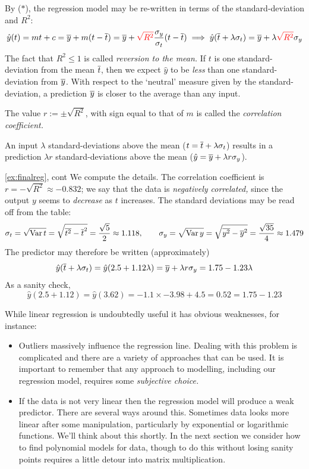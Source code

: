 
By ($\ast$), the regression model may be re-written in terms of the standard-deviation and $R^2$: 
\[\hat y(t)=mt+c=\overline{y}+m(t-\overline{t}) =\overline{y}+\textcolor{red}{\sqrt{R^2}}\frac{\sigma_y}{\sigma_t}(t-\overline{t}) \implies \hat y(\overline{t}+\lambda\sigma_t)=\overline{y}+\lambda\textcolor{red}{\sqrt{R^2}}\sigma_y\]
The fact that $R^2\le 1$ is called \emph{reversion to the mean.} If $t$ is one standard-deviation from the mean $\overline{t}$, then we expect $\hat y$ to be \emph{less} than one standard-deviation from $\overline{y}$. With respect to the `neutral' measure given by the standard-deviation, a prediction $\overline{y}$ is closer to the average than any input.

\begin{defn}{}{}
The value $r:=\pm\sqrt{R^2}$, with sign equal to that of $m$ is called the \emph{correlation coefficient.}
\end{defn}

An input $\lambda$ standard-deviations above the mean ($t=\overline{t}+\lambda\sigma_t$) results in a prediction $\lambda r$ standard-deviations above the mean ($\hat y=\overline{y}+\lambda r\sigma_y$).

\begin{example*}{\ref{ex:finalreg}, cont}{}
We compute the details. The correlation coefficient is $r=-\sqrt{R^2}\approx -0.832$; we say that the data is \emph{negatively correlated,} since the output $y$ seems to \emph{decrease} as $t$ increases. The standard deviations may be read off from the table:
\[\sigma_t=\sqrt{\operatorname{Var} t}=\sqrt{\overline{t^2}-\overline{t}^2}=\frac{\sqrt 5}2\approx 1.118,\qquad \sigma_y=\sqrt{\operatorname{Var} y}=\sqrt{\overline{y^2}-\overline{y}^2}=\frac{\sqrt{35}}4\approx 1.479\]
The predictor may therefore be written (approximately)
\[\hat y(\overline{t}+\lambda\sigma_t)=\hat y(2.5+1.12\lambda) =\overline{y}+\lambda r\sigma_y =1.75-1.23\lambda\]
As a sanity check,
\[\hat y(2.5+1.12)=\hat y(3.62)=-1.1\times -3.98+4.5=0.52 =1.75-1.23\]
\end{example*}






While linear regression is undoubtedly useful it has obvious weaknesses, for instance:
\begin{itemize}
  \item Outliers massively influence the regression line. Dealing with this problem is complicated and there are a variety of approaches that can be used. It is important to remember that any approach to modelling, including our regression model, requires some \emph{subjective choice.}
  \item If the data is not very linear then the regression model will produce a weak predictor. There are several ways around this. Sometimes data looks more linear after some manipulation, particularly by exponential or logarithmic functions. We'll think about this shortly. In the next section we consider how to find polynomial models for data, though to do this without losing sanity points requires a little detour into matrix multiplication.
\end{itemize}


